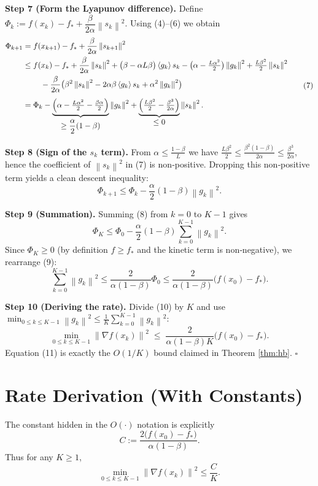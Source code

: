 \documentclass{article}
\newcommand{\norm}[1]{\left\lVert#1\right\rVert}
\newcommand{\inner}[1]{\left\langle#1\right\rangle}
\begin{document}
\noindent\textbf{Step 7 (Form the Lyapunov difference).}  
Define $\Phi_k:=f(x_k)-f_*+\dfrac{\beta}{2\alpha}\norm{s_k}^2$.  Using (4)–(6) we obtain
\[
\begin{aligned}
\Phi_{k+1}
&=f(x_{k+1})-f_*+\frac{\beta}{2\alpha}\norm{s_{k+1}}^2\\
&\le f(x_k)-f_*+\frac{\beta}{2\alpha}\norm{s_k}^2
   +\bigl(\beta-\alpha L\beta\bigr)\inner{g_k}{s_k}
   -\bigl(\alpha-\tfrac{L\alpha^2}{2}\bigr)\norm{g_k}^2
   +\tfrac{L\beta^2}{2}\norm{s_k}^2 \\
&\qquad\;-\frac{\beta}{2\alpha}\bigl(\beta^2\norm{s_k}^2-2\alpha\beta\inner{g_k}{s_k}+\alpha^2\norm{g_k}^2\bigr)\\[4pt]
&= \Phi_k
   -\underbrace{\Bigl(\alpha-\tfrac{L\alpha^2}{2}-\tfrac{\beta\alpha}{2}\Bigr)}_{\displaystyle\ge\frac{\alpha}{2}(1-\beta)}
      \norm{g_k}^2
   +\underbrace{\Bigl(\tfrac{L\beta^2}{2}-\tfrac{\beta^3}{2\alpha}\Bigr)}_{\displaystyle\le 0}
      \norm{s_k}^2 .
\end{aligned}
\tag{7}
\]

\noindent\textbf{Step 8 (Sign of the $s_k$ term).}  
From $\alpha\le\frac{1-\beta}{L}$ we have $\frac{L\beta^2}{2}\le\frac{\beta^2(1-\beta)}{2\alpha}\le\frac{\beta^3}{2\alpha}$, hence the coefficient of $\norm{s_k}^2$ in (7) is non‑positive. Dropping this non‑positive term yields a clean descent inequality:
\[
\Phi_{k+1}\le \Phi_k-\frac{\alpha}{2}(1-\beta)\norm{g_k}^2.
\tag{8}
\]

\noindent\textbf{Step 9 (Summation).}  
Summing (8) from $k=0$ to $K-1$ gives
\[
\Phi_K\le \Phi_0-\frac{\alpha}{2}(1-\beta)\sum_{k=0}^{K-1}\norm{g_k}^2.
\tag{9}
\]
Since $\Phi_K\ge 0$ (by definition $f\ge f_*$ and the kinetic term is non‑negative), we rearrange (9):
\[
\sum_{k=0}^{K-1}\norm{g_k}^2\le \frac{2}{\alpha(1-\beta)}\Phi_0
   \le \frac{2}{\alpha(1-\beta)}\bigl(f(x_0)-f_*\bigr).
\tag{10}
\]

\noindent\textbf{Step 10 (Deriving the rate).}  
Divide (10) by $K$ and use $\min_{0\le k\le K-1}\norm{g_k}^2\le \frac{1}{K}\sum_{k=0}^{K-1}\norm{g_k}^2$:
\[
\min_{0\le k\le K-1}\norm{\nabla f(x_k)}^2
\;\le\;
\frac{2}{\alpha(1-\beta)K}\bigl(f(x_0)-f_*\bigr).
\tag{11}
\]
Equation (11) is exactly the $O(1/K)$ bound claimed in Theorem \ref{thm:hb}.  $\square$

\section*{Rate Derivation (With Constants)}
The constant hidden in the $O(\cdot)$ notation is explicitly
\[
C:=\frac{2\bigl(f(x_0)-f_*\bigr)}{\alpha(1-\beta)}.
\]
Thus for any $K\ge 1$,
\[
\min_{0\le k\le K-1}\norm{\nabla f(x_k)}^2\le \frac{C}{K}.
\]
\end{document}
